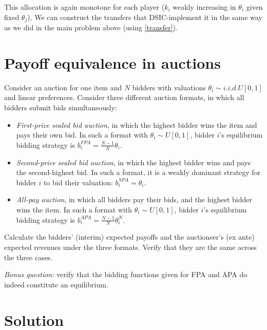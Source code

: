 \documentclass[a4paper]{article}
\newif\ifsolutions
\begin{document}
This allocation is again monotone for each player ($k_i$ weakly increasing in $\theta_i$ given fixed $\theta_j$). We can construct the transfers that DSIC-implement it in the same way as we did in the main problem above (using \eqref{transfer}).


\fi



\section{Payoff equivalence in auctions}

Consider an auction for one item and $N$ bidders with valuations $\theta_i \sim i.i.d.U[0,1]$ and linear preferences. Consider three different auction formats, in which all bidders submit bids simultaneously:
\begin{itemize}
	\item \emph{First-price sealed bid auction}, in which the highest bidder wins the item and pays their own bid. In such a format with $\theta_i \sim U[0,1]$, bidder $i$'s equilibrium bidding strategy is $b_i^{FPA} = \frac{N-1}{N} \theta_i$.
	\item \emph{Second-price sealed bid auction}, in which the highest bidder wins and pays the second-highest bid. In such a format, it is a weakly dominant strategy for bidder $i$ to bid their valuation: $b_i^{SPA} = \theta_i$.
	\item \emph{All-pay auction}, in which all bidders pay their bids, and the highest bidder wins the item. In such a format with $\theta_i \sim U[0,1]$, bidder $i$'s equilibrium bidding strategy is $b_i^{APA} = \frac{N-1}{N} \theta_i^N$.
\end{itemize}
Calculate the bidders' (interim) expected payoffs and the auctioneer's (ex ante) expected revenues under the three formats. Verify that they are the same across the three cases.

\emph{Bonus question:} verify that the bidding functions given for FPA and APA do indeed constitute an equilibrium.

\ifsolutions
\section*{Solution}
\end{document}
